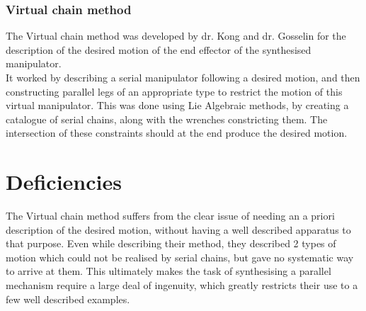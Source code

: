 \subsubsection{Virtual chain method}
{
    The Virtual chain method was developed by dr. Kong and dr. Gosselin for the description of the desired motion of the end effector of the synthesised manipulator.\\
    It worked by describing a serial manipulator following a desired motion, and then constructing parallel legs of an appropriate type to restrict the motion of this virtual manipulator. This was done using Lie Algebraic methods, by creating a catalogue of serial chains, along with the wrenches constricting them.
    The intersection of these constraints should at the end produce the desired motion.
}


\section{Deficiencies}

The Virtual chain method suffers from the clear issue of needing an a priori description of the desired motion, without having a well described apparatus to that purpose. 
Even while describing their method, they described 2 types of motion which could not be realised by serial chains, but gave no systematic way to arrive at them. This ultimately makes the task of synthesising a parallel mechanism require a large deal of ingenuity, which greatly restricts their use to a few well described examples.




